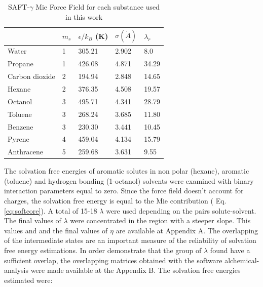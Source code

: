 \begin{table}[h]
\centering
  \caption{SAFT-$\gamma$ Mie Force Field for each substance used in this work}
  \label{tbl:parameters}
  \begin{tabular}{lllll}
  	\hline
  	               & $m_s$ & $\epsilon/k_{B}$ (K) & $\sigma (\dot{A})$ & $\lambda_r$ \\ \hline
  	Water          & 1     & 305.21               & 2.902              & 8.0         \\
  	Propane        & 1     & 426.08               & 4.871              & 34.29       \\
  	Carbon dioxide & 2     & 194.94               & 2.848              & 14.65       \\
  	Hexane         & 2     & 376.35               & 4.508              & 19.57       \\
  	Octanol        & 3     & 495.71               & 4.341              & 28.79       \\
  	Toluene        & 3     & 268.24               & 3.685              & 11.80       \\
  	Benzene        & 3     & 230.30               & 3.441              & 10.45       \\
  	Pyrene         & 4     & 459.04               & 4.134              & 15.79       \\
  	Anthracene     & 5     & 259.68               & 3.631              & 9.55        \\ \hline
  \end{tabular}

\end{table}

The solvation free energies of aromatic solutes in non polar (hexane), aromatic (toluene) and hydrogen bonding (1-octanol) solvents were examined with binary interaction parameters equal to zero. Since the force field doesn't account for charges, the solvation free energy is equal to the Mie contribution ( Eq. \eqref{eq:softcore}). A total of 15-18 $\lambda$ were used depending on the pairs solute-solvent. The final values of $\lambda$ were concentrated in the region with a steeper slope. This values and and the final values of $\eta$ are available at  Appendix A. The overlapping of the intermediate states are an important measure of the reliability of solvation free energy estimations. In order demonstrate that the group of $\lambda$ found have a sufficient overlap, the overlapping matrices obtained with the software alchemical-analysis were made available at the Appendix B. The solvation free energies estimated  were:

